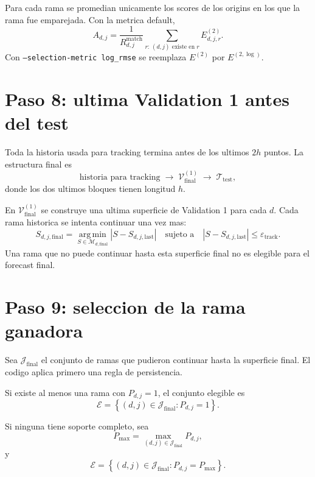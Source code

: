 \documentclass[11pt]{article}
\newcommand{\argmin}{\operatorname*{arg\,min}}
\begin{document}
Para cada rama se promedian unicamente los scores de los origins en los que la
rama fue emparejada. Con la metrica default,
\begin{equation}
A_{d,j}
=
\frac{1}{R^{\mathrm{match}}_{d,j}}
\sum_{r:\,(d,j)\text{ existe en }r}
E^{(2)}_{d,j,r}.
\label{eq:branchscore}
\end{equation}
Con \texttt{--selection-metric log\_rmse} se reemplaza \(E^{(2)}\) por
\(E^{(2,\log)}\).

\section{Paso 8: ultima Validation 1 antes del test}

Toda la historia usada para tracking termina antes de los ultimos \(2h\) puntos.
La estructura final es
\[
\boxed{\text{historia para tracking}}
\;\longrightarrow\;
\boxed{\mathcal{V}^{(1)}_{\mathrm{final}}}
\;\longrightarrow\;
\boxed{\mathcal{T}_{\mathrm{test}}},
\]
donde los dos ultimos bloques tienen longitud \(h\).

En \(\mathcal{V}^{(1)}_{\mathrm{final}}\) se construye una ultima superficie de
Validation 1 para cada \(d\). Cada rama historica se intenta continuar una vez
mas:
\begin{equation}
S_{d,j,\mathrm{final}}
=
\argmin_{S\in\mathcal{M}_{d,\mathrm{final}}}
|S-S_{d,j,\mathrm{last}}|
\quad
\text{sujeto a}
\quad
|S-S_{d,j,\mathrm{last}}|
\le
\varepsilon_{\mathrm{track}}.
\label{eq:final-continuation}
\end{equation}
Una rama que no puede continuar hasta esta superficie final no es elegible para
el forecast final.

\section{Paso 9: seleccion de la rama ganadora}

Sea \(\mathcal{J}_{\mathrm{final}}\) el conjunto de ramas que pudieron continuar
hasta la superficie final. El codigo aplica primero una regla de persistencia.

Si existe al menos una rama con \(P_{d,j}=1\), el conjunto elegible es
\begin{equation}
\mathcal{E}
=
\left\{
(d,j)\in\mathcal{J}_{\mathrm{final}}:
P_{d,j}=1
\right\}.
\label{eq:eligible1}
\end{equation}

Si ninguna tiene soporte completo, sea
\[
P_{\max}
=
\max_{(d,j)\in\mathcal{J}_{\mathrm{final}}}P_{d,j},
\]
y
\begin{equation}
\mathcal{E}
=
\left\{
(d,j)\in\mathcal{J}_{\mathrm{final}}:
P_{d,j}=P_{\max}
\right\}.
\label{eq:eligible2}
\end{equation}
\end{document}
